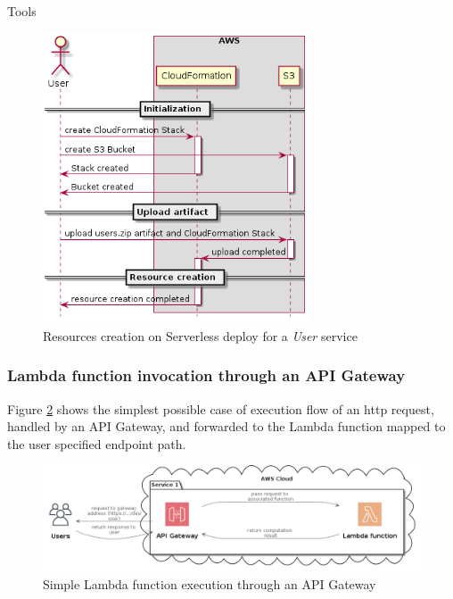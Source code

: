 \begin{chapter}{Tools}
    \begin{figure}
        \centering
        \includegraphics[width=8cm]{source/diagrams/sls_deploy_on_aws.png}
        \caption{Resources creation on Serverless deploy for a \textit{User} service}
        \label{fig:sls_deploy_on_aws}
    \end{figure}

    \subsubsection{Lambda function invocation through an API Gateway}
    \label{subsec:lambda_invocation}

    Figure \ref{fig:simple_lambda} shows the simplest possible case of execution
    flow of an http request, handled by an API Gateway, and forwarded to the Lambda
    function mapped to the user specified endpoint path.

    \begin{figure}
        \centering
        \includegraphics[width=\linewidth]{source/diagrams/lambda_invocation.png}
        \caption{Simple Lambda function execution through an API Gateway}
        \label{fig:simple_lambda}
    \end{figure}


\end{chapter}
